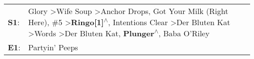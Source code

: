 \begin{supertabular}{p{0.03\textwidth}p{0.92\textwidth}}
 \textbf{S1}:  &  Glory\textsuperscript{} \textgreater \enspace Wife Soup\textsuperscript{} \textgreater \enspace Anchor Drops\textsuperscript{}, \enspace Got Your Milk (Right Here)\textsuperscript{}, \enspace \#5\textsuperscript{} \textgreater \enspace \textbf{Ringo[1]\textsuperscript{$\wedge$}}, \enspace Intentions Clear\textsuperscript{} \textgreater \enspace Der Bluten Kat\textsuperscript{} \textgreater \enspace Words\textsuperscript{} \textgreater \enspace Der Bluten Kat\textsuperscript{}, \enspace \textbf{Plunger\textsuperscript{$\wedge$}}, \enspace Baba O'Riley\textsuperscript{}  \enspace  \\
 \textbf{E1}:  &                                                                                                                                                                                                                                                                                                                                                                                                                                                                                                                                                                Partyin' Peeps\textsuperscript{}  \enspace  \\
\end{supertabular}
